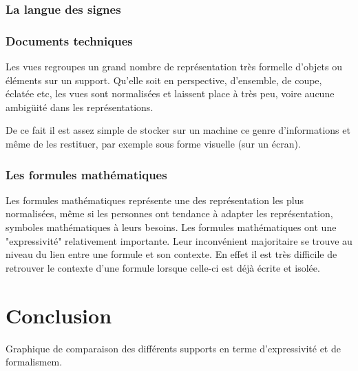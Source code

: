 \documentclass[french,a4paper]{article}
\begin{document}
\subsubsection{La langue des signes}

\subsubsection{Documents techniques}
Les vues regroupes un grand nombre de représentation très formelle d'objets ou éléments sur un support. Qu'elle soit
en perspective, d'ensemble, de coupe, éclatée etc, les vues sont normalisées et laissent place à très peu, voire aucune ambigüité dans les
représentations.

De ce fait il est assez simple de stocker sur un machine ce genre d'informations et même de les restituer, par exemple sous
forme visuelle (sur un écran).

\subsubsection{Les formules mathématiques}
Les formules mathématiques représente une des représentation les plus normalisées, même si les personnes ont tendance à 
adapter les représentation, symboles mathématiques à leurs besoins.
Les formules mathématiques ont une "expressivité" relativement importante. Leur inconvénient majoritaire se trouve au niveau 
du lien entre une formule et son contexte.
En effet il est très difficile de retrouver le contexte d'une formule lorsque celle-ci est déjà écrite et isolée.


\section{Conclusion}
Graphique de comparaison des différents supports en terme d'expressivité et de formalismem.
\end{document}
